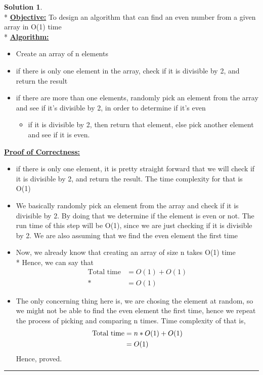 \documentclass{article}
\theoremstyle{definition}
\def\fline{\rule{0.75\linewidth}{0.5pt}}
\newcommand{\finishline}{\vspace{-15pt}\begin{center}\fline\end{center}}
\newtheorem*{solution*}{Solution}
\newenvironment{solution}{\begin{solution*}}{{\finishline} \end{solution*}}
\begin{document}
\begin{solution}
	\hfill \bigskip\\*
	\textbf{\underline{Objective:}} To design an algorithm that can find an even number from a given array in O(1) time \bigskip\\*
	\textbf{\underline{Algorithm:}}
	\begin{itemize}
		\item Create an array of n elements
		\item if there is only one element in the array, check if it is divisible by 2, and return the result
		\item if there are more than one elements, randomly pick an element from the array and see if it's divisible by 2, in order to determine if it's even
		\begin{itemize}
			\item if it is divisible by 2, then return that element, else pick another element and see if it is even.
		\end{itemize}
	\end{itemize}
	\textbf{\underline{Proof of Correctness:}}
		\begin{itemize}
		\item if there is only one element, it is pretty straight forward that we will check if it is divisible by 2, and return the result. The time complexity for that is O(1)
		\item We basically randomly pick an element from the array and check if it is divisible by 2. By doing that we determine if the element is even or not. The run time of this step will be O(1), since we are just checking if it is divisible by 2. We are also assuming that we find the even element the first time
		\item Now, we already know that creating an array of size n takes O(1) time \bigskip\\*
		Hence, we can say that 
		\begin{align*}
			{\text{Total time}} &= O(1) + O(1)\\*
			 		          &= O(1)
		\end{align*}
		\item The only concerning thing here is, we are chosing the element at random, so we might not be able to find the even element the first time, hence we repeat the process of picking and comparing n times. Time complexity of that is,
 		\begin{align*}
			{\text{Total time}} &= n*O(1) + O(1)\\*
			 &= O(1) \bigskip
		\end{align*}
		Hence, proved.
		\end{itemize}
\end{solution}
\end{document}
